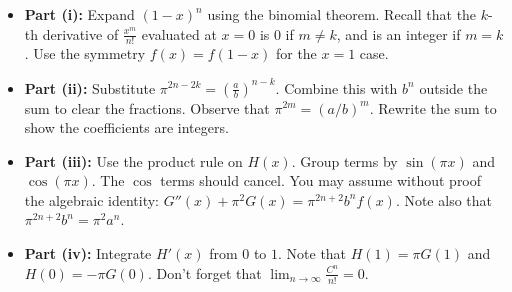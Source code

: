 \begin{hint}
\begin{itemize}
    \item \textbf{Part (i):} Expand $(1-x)^n$ using the binomial theorem. Recall that the $k$-th derivative of $\frac{x^m}{n!}$ evaluated at $x=0$ is $0$ if $m \neq k$, and is an integer if $m=k$. Use the symmetry $f(x)=f(1-x)$ for the $x=1$ case.
    \item \textbf{Part (ii):} Substitute $\pi^{2n-2k} = (\frac{a}{b})^{n-k}$. Combine this with $b^n$ outside the sum to clear the fractions. Observe that $\pi^{2m} = (a/b)^m$. Rewrite the sum to show the coefficients are integers.
    \item \textbf{Part (iii):} Use the product rule on $H(x)$. Group terms by $\sin(\pi x)$ and $\cos(\pi x)$. The $\cos$ terms should cancel. You may assume without proof the algebraic identity: $G''(x) + \pi^2 G(x) = \pi^{2n+2} b^n f(x)$. Note also that $\pi^{2n+2} b^n = \pi^2 a^n$.
    \item \textbf{Part (iv):} Integrate $H'(x)$ from $0$ to $1$. Note that $H(1) = \pi G(1)$ and $H(0) = -\pi G(0)$. Don't forget that $\lim_{n \to \infty} \frac{C^n}{n!} = 0$.
\end{itemize}
\end{hint}

